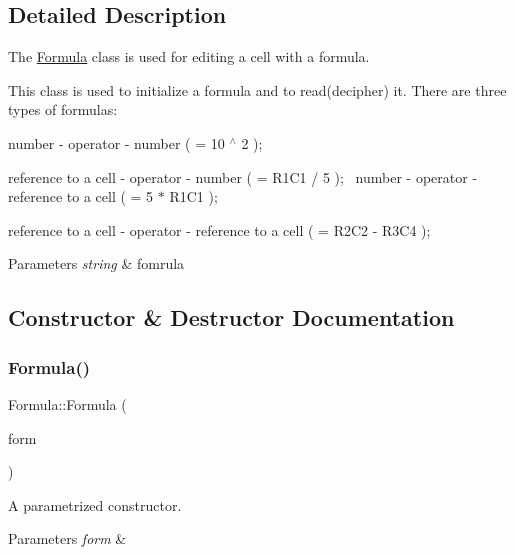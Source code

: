 \subsection{Detailed Description}
The \hyperlink{class_formula}{Formula} class is used for editing a cell with a formula. 

This class is used to initialize a formula and to read(decipher) it. There are three types of formulas\+: ~\newline

\begin{DoxyEnumerate}
\item number -\/ operator -\/ number ( = 10 $^\wedge$ 2 );
\item reference to a cell -\/ operator -\/ number ( = R1\+C1 / 5 );~\newline
 number -\/ operator -\/ reference to a cell ( = 5 $\ast$ R1\+C1 );
\item reference to a cell -\/ operator -\/ reference to a cell ( = R2\+C2 -\/ R3\+C4 );
\end{DoxyEnumerate}


\begin{DoxyParams}{Parameters}
{\em string} & fomrula \\
\hline
\end{DoxyParams}


\subsection{Constructor \& Destructor Documentation}
\mbox{\label{class_formula_aed38ad076eb638148bcbe867d6acea60}} 
\subsubsection{\texorpdfstring{Formula()}{Formula()}}
{\footnotesize\ttfamily Formula\+::\+Formula (\begin{DoxyParamCaption}\item[{string}]{form }\end{DoxyParamCaption})\hspace{0.3cm}{\ttfamily [inline]}}

A parametrized constructor. 
\begin{DoxyParams}{Parameters}
{\em form} & \\
\hline
\end{DoxyParams}


